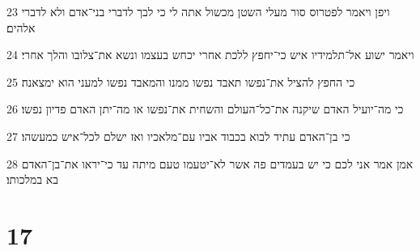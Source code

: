 \par 23 ויפן ויאמר לפטרוס סור מעלי השטן מכשול אתה לי כי לבך לדברי בני־אדם ולא לדברי אלהים׃
\par 24 ויאמר ישוע אל־תלמידיו איש כי־יחפץ ללכת אחרי יכחש בעצמו ונשא את־צלובו והלך אחרי׃
\par 25 כי החפץ להציל את־נפשו תאבד נפשו ממנו והמאבד נפשו למעני הוא ימצאנה׃
\par 26 כי מה־יועיל האדם שיקנה את־כל־העולם והשחית את־נפשו או מה־יתן האדם פדיון נפשו׃
\par 27 כי בן־האדם עתיד לבוא בכבוד אביו עם־מלאכיו ואז ישלם לכל־איש כמעשהו׃
\par 28 אמן אמר אני לכם כי יש בעמדים פה אשר לא־יטעמו טעם מיתה עד כי־יראו את־בן־האדם בא במלכותו׃

\chapter{17}

